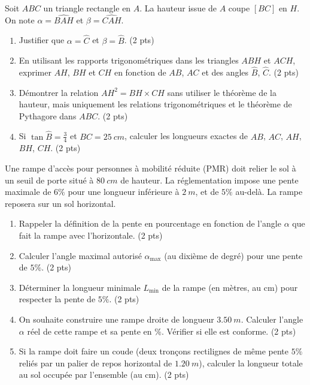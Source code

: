 \documentclass[11pt]{article}
\begin{document}
\begin{exercice}
Soit $ABC$ un triangle rectangle en $A$. La hauteur issue de $A$ coupe $[BC]$ en $H$. On note $\alpha = \widehat{BAH}$ et $\beta = \widehat{CAH}$.
\begin{enumerate}
    \item Justifier que $\alpha = \widehat{C}$ et $\beta = \widehat{B}$. (2 pts)
    \item En utilisant les rapports trigonométriques dans les triangles $ABH$ et $ACH$, exprimer $AH$, $BH$ et $CH$ en fonction de $AB$, $AC$ et des angles $\widehat{B}$, $\widehat{C}$. (2 pts)
    \item Démontrer la relation $AH^2 = BH \times CH$ sans utiliser le théorème de la hauteur, mais uniquement les relations trigonométriques et le théorème de Pythagore dans $ABC$. (2 pts)
    \item Si $\tan\widehat{B} = \frac{3}{4}$ et $BC = \SI{25}{cm}$, calculer les longueurs exactes de $AB$, $AC$, $AH$, $BH$, $CH$. (2 pts)
\end{enumerate}
\end{exercice}

\begin{exercice}
Une rampe d'accès pour personnes à mobilité réduite (PMR) doit relier le sol à un seuil de porte situé à $\SI{80}{cm}$ de hauteur. La réglementation impose une pente maximale de $6\%$ pour une longueur inférieure à $\SI{2}{m}$, et de $5\%$ au-delà. La rampe reposera sur un sol horizontal.
\begin{enumerate}
    \item Rappeler la définition de la pente en pourcentage en fonction de l'angle $\alpha$ que fait la rampe avec l'horizontale. (2 pts)
    \item Calculer l'angle maximal autorisé $\alpha_{\text{max}}$ (au dixième de degré) pour une pente de $5\%$. (2 pts)
    \item Déterminer la longueur minimale $L_{\text{min}}$ de la rampe (en mètres, au cm) pour respecter la pente de $5\%$. (2 pts)
    \item On souhaite construire une rampe droite de longueur $\SI{3.50}{m}$. Calculer l'angle $\alpha$ réel de cette rampe et sa pente en \%. Vérifier si elle est conforme. (2 pts)
    \item Si la rampe doit faire un coude (deux tronçons rectilignes de même pente $5\%$ reliés par un palier de repos horizontal de $\SI{1.20}{m}$), calculer la longueur totale au sol occupée par l'ensemble (au cm). (2 pts)
\end{enumerate}
\end{exercice}
\end{document}
